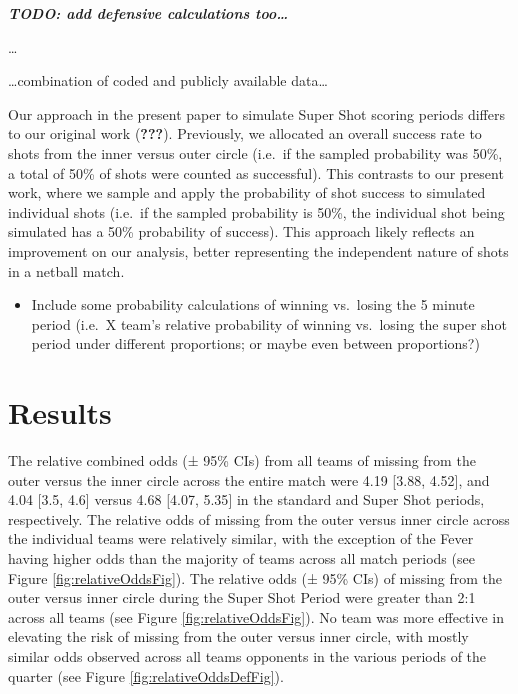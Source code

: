 \documentclass[]{elsarticle} %
\providecommand{\tightlist}{%
  \setlength{\itemsep}{0pt}\setlength{\parskip}{0pt}}
\begin{document}
\textbf{\emph{TODO: add defensive calculations too\ldots{}}}

\ldots{}

\ldots combination of coded and publicly available data\ldots{}

Our approach in the present paper to simulate Super Shot scoring periods
differs to our original work ({\textbf{???}}). Previously, we allocated
an overall success rate to shots from the inner versus outer circle
(i.e.~if the sampled probability was 50\%, a total of 50\% of shots were
counted as successful). This contrasts to our present work, where we
sample and apply the probability of shot success to simulated individual
shots (i.e.~if the sampled probability is 50\%, the individual shot
being simulated has a 50\% probability of success). This approach likely
reflects an improvement on our analysis, better representing the
independent nature of shots in a netball match.

\begin{itemize}
\tightlist
\item
  Include some probability calculations of winning vs.~losing the 5
  minute period (i.e.~X team's relative probability of winning
  vs.~losing the super shot period under different proportions; or maybe
  even between proportions?)
\end{itemize}

\hypertarget{results}{%
\section{Results}\label{results}}

The relative combined odds (± 95\% CIs) from all teams of missing from
the outer versus the inner circle across the entire match were 4.19
{[}3.88, 4.52{]}, and 4.04 {[}3.5, 4.6{]} versus 4.68 {[}4.07, 5.35{]}
in the standard and Super Shot periods, respectively. The relative odds
of missing from the outer versus inner circle across the individual
teams were relatively similar, with the exception of the Fever having
higher odds than the majority of teams across all match periods (see
Figure \ref{fig:relativeOddsFig}). The relative odds (± 95\% CIs) of
missing from the outer versus inner circle during the Super Shot Period
were greater than 2:1 across all teams (see Figure
\ref{fig:relativeOddsFig}). No team was more effective in elevating the
risk of missing from the outer versus inner circle, with mostly similar
odds observed across all teams opponents in the various periods of the
quarter (see Figure \ref{fig:relativeOddsDefFig}).
\end{document}
